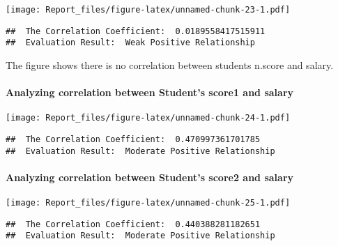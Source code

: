 \documentclass[
]{article}
\newenvironment{Shaded}{\begin{snugshade}}{\end{snugshade}}
\newcommand{\KeywordTok}[1]{\textcolor[rgb]{0.13,0.29,0.53}{\textbf{#1}}}
\newcommand{\NormalTok}[1]{#1}
\newcommand{\OperatorTok}[1]{\textcolor[rgb]{0.81,0.36,0.00}{\textbf{#1}}}
\begin{document}
\texttt{[image: Report\_files/figure-latex/unnamed-chunk-23-1.pdf]}

\begin{verbatim}
##  The Correlation Coefficient:  0.0189558417515911 
##  Evaluation Result:  Weak Positive Relationship
\end{verbatim}

The figure shows there is no correlation between students n.score and
salary.

\hypertarget{analyzing-correlation-between-students-score1-and-salary}{%
\paragraph{Analyzing correlation between Student's score1 and
salary}\label{analyzing-correlation-between-students-score1-and-salary}}

\begin{Shaded}
\end{Shaded}

\texttt{[image: Report\_files/figure-latex/unnamed-chunk-24-1.pdf]}

\begin{verbatim}
##  The Correlation Coefficient:  0.470997361701785 
##  Evaluation Result:  Moderate Positive Relationship
\end{verbatim}

\hypertarget{analyzing-correlation-between-students-score2-and-salary}{%
\paragraph{Analyzing correlation between Student's score2 and
salary}\label{analyzing-correlation-between-students-score2-and-salary}}

\begin{Shaded}
\end{Shaded}

\texttt{[image: Report\_files/figure-latex/unnamed-chunk-25-1.pdf]}

\begin{verbatim}
##  The Correlation Coefficient:  0.440388281182651 
##  Evaluation Result:  Moderate Positive Relationship
\end{verbatim}
\end{document}
